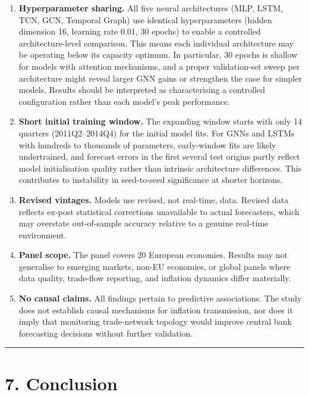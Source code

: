 \documentclass[
  11pt,
  a4paper]{article}
\begin{document}
\begin{enumerate}
\def\labelenumi{\arabic{enumi}.}
\item
  \textbf{Hyperparameter sharing.} All five neural architectures (MLP,
  LSTM, TCN, GCN, Temporal Graph) use identical hyperparameters (hidden
  dimension 16, learning rate 0.01, 30 epochs) to enable a controlled
  architecture-level comparison. This means each individual architecture
  may be operating below its capacity optimum. In particular, 30 epochs
  is shallow for models with attention mechanisms, and a proper
  validation-set sweep per architecture might reveal larger GNN gains or
  strengthen the case for simpler models. Results should be interpreted
  as characterising a controlled configuration rather than each model's
  peak performance.
\item
  \textbf{Short initial training window.} The expanding window starts
  with only 14 quarters (2011Q2--2014Q4) for the initial model fits. For
  GNNs and LSTMs with hundreds to thousands of parameters, early-window
  fits are likely undertrained, and forecast errors in the first several
  test origins partly reflect model initialisation quality rather than
  intrinsic architecture differences. This contributes to instability in
  seed-to-seed significance at shorter horizons.
\item
  \textbf{Revised vintages.} Models use revised, not real-time, data.
  Revised data reflects ex-post statistical corrections unavailable to
  actual forecasters, which may overstate out-of-sample accuracy
  relative to a genuine real-time environment.
\item
  \textbf{Panel scope.} The panel covers 20 European economies. Results
  may not generalise to emerging markets, non-EU economies, or global
  panels where data quality, trade-flow reporting, and inflation
  dynamics differ materially.
\item
  \textbf{No causal claims.} All findings pertain to predictive
  associations. The study does not establish causal mechanisms for
  inflation transmission, nor does it imply that monitoring
  trade-network topology would improve central bank forecasting
  decisions without further validation.
\end{enumerate}

\begin{center}\rule{0.5\linewidth}{0.5pt}\end{center}

\section{7. Conclusion}\label{conclusion}
\end{document}
